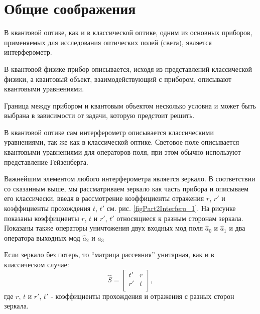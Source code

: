 \section{Общие соображения}
В квантовой оптике, как и в классической оптике, одним из основных
приборов, применяемых для исследования оптических полей (света),
является интерферометр.

В квантовой физике прибор описывается, исходя из представлений
классической физики, а квантовый объект, взаимодействующий с прибором,
описывают квантовыми уравнениями.

Граница между прибором и квантовым объектом несколько условна и может
быть выбрана в зависимости от задачи, которую предстоит решить. 

В квантовой оптике сам интерферометр описывается классическими
уравнениями, так же как в классической оптике. Световое поле
описывается квантовыми уравнениями для операторов поля, при этом
обычно используют представление Гейзенберга.

Важнейшим элементом любого интерферометра является зеркало. В
соответствии со сказанным выше, мы рассматриваем зеркало как часть
прибора и описываем его классически, введя в рассмотрение коэффициенты
отражения $r$, $r'$ и коэффициенты прохождения $t$, $t'$
см. рис. \ref{figPart2Interfero_1}. На рисунке показаны коэффициенты
$r$, $t$ и $r'$, $t'$ относящиеся к разным сторонам зеркала. Показаны
также операторы уничтожения двух входных мод поля $\hat{a}_0$ и
$\hat{a}_1$ и два оператора выходных мод $\hat{a}_2$ и $\hat{a}_3$



Если зеркало без потерь, то ``матрица рассеяния'' унитарная, как и в
классическом случае:
\[
\hat{S} = 
\begin{bmatrix}
t' & r \\
r' & t \\
\end{bmatrix},
\]
где $r$, $t$ и $r'$, $t'$ - коэффициенты прохождения и отражения с
разных сторон зеркала.

